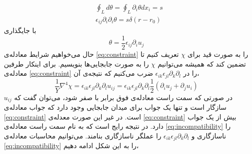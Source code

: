  \begin{equation}
\begin{aligned}
&\oint_Ld\theta=\oint_L\partial_i\theta dx_i=s\\
&\epsilon_{ij}\partial_i\partial_i\theta=s\delta(r-r_0)
\label{eq:thetauij}
\end{aligned}
\end{equation}
با جایگذاری
\begin{equation}
\theta=\frac{1}{2}\epsilon_{ij}\partial_iu_j
\end{equation}
حال می‌خواهیم شرایط معادله‌ی 
\ref{eq:constraint}
را به صورت قید برای $\chi$
تعریف کنیم تا تضمین کند که همیشه می‌توانیم $\chi$
را به صورت جابجایی‌ها بنویسیم. برای اینکار طرفین معادله‌ی 
\ref{eq:constraint}
را در 
$\epsilon_{ik}\epsilon_{jl}\partial_k\partial_l$
ضرب می‌کنیم که نتیجه‌ی آن،
\begin{equation}
\frac{1}{Y}\nabla^4\chi=\epsilon_{ik}\epsilon_{jl}\partial_k\partial_lu_{ij}=\epsilon_{ik}\epsilon_{jl}\partial_k\partial_l\frac{1}{2}(\partial_iu_j+\partial_ju_i)
\label{eq:incompatibility}
\end{equation}
در صورتی که سمت راست معادله‌ی فوق برابر با صفر شود، می‌توان گفت که $u_{ij}$ 
سازگار است و تنها یک جواب برای میدان جابجایی وجود دارد که جواب معادله‌ی 
\ref{eq:constraint}
است. در غیر این صورت معدله‌ی 
\ref{eq:constraint}
بیش از یک جواب دارد. در نتیجه رایج است که به نام سمت راست معادله‌ی
\ref{eq:incompatibility}
را ناسازگاری
و $\epsilon_{ik}\epsilon_{jl}\partial_k\partial_l$
را عملگر ناسازگاری بنامند. می‌توانیم محاسبات معادله‌ی 
\ref{eq:incompatibility}
را به این شکل ادامه دهیم،

